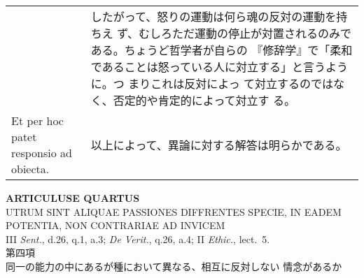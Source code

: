 \documentclass[10pt]{jsarticle} %
\begin{document}
\begin{longtable}{p{21em}p{21em}}
&

したがって、怒りの運動は何ら魂の反対の運動を持ちえ
 ず、むしろただ運動の停止が対置されるのみである。ちょうど哲学者が自らの
 『修辞学』で「柔和であることは怒っている人に対立する」と言うように。つ
 まりこれは反対によっ て対立するのではなく、否定的や肯定的によって対立す
 る。




\\



Et per hoc patet responsio ad obiecta.

&

以上によって、異論に対する解答は明らかである。


\end{longtable}
\newpage

\begin{center}
{\Large {\bf ARTICULUSE QUARTUS}\\
{\large UTRUM SINT ALIQUAE PASSIONES DIFFRENTES SPECIE, IN EADEM
 POTENTIA, NON CONTRARIAE AD INVICEM}}\\
{\footnotesize III {\itshape Sent.}, d.26, q.1, a.3; {\itshape De
 Verit.}, q.26, a.4; II {\itshape Ethic.}, lect.~5.}\\
{\Large 第四項\\同一の能力の中にあるが種において異なる、相互に反対しない
 情念があるか}
\end{center}
\end{document}
